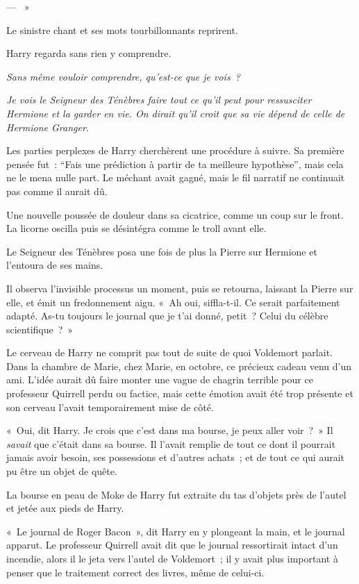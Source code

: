 --- ~»

Le sinistre chant et ses mots tourbillonnants reprirent.

Harry regarda sans rien y comprendre.

\emph{Sans même vouloir comprendre, qu'est-ce que je vois~?}

\emph{Je vois le Seigneur des Ténèbres faire tout ce qu'il peut pour ressusciter Hermione et la garder en vie. On dirait qu'il croit que sa vie dépend de celle de Hermione Granger}.

Les parties perplexes de Harry cherchèrent une procédure à suivre. Sa première pensée fut~: “Fais une prédiction à partir de ta meilleure hypothèse”, mais cela ne le mena nulle part. Le méchant avait gagné, mais le fil narratif ne continuait pas comme il aurait dû.

Une nouvelle poussée de douleur dans sa cicatrice, comme un coup sur le front. La licorne oscilla puis se désintégra comme le troll avant elle.

Le Seigneur des Ténèbres posa une fois de plus la Pierre sur Hermione et l'entoura de ses mains.

Il observa l'invisible processus un moment, puis se retourna, laissant la Pierre sur elle, et émit un fredonnement aigu. «~Ah oui, siffla-t-il. Ce serait parfaitement adapté. As-tu toujours le journal que je t'ai donné, petit~? Celui du célèbre scientifique~?~»

Le cerveau de Harry ne comprit pas tout de suite de quoi Voldemort parlait. Dans la chambre de Marie, chez Marie, en octobre, ce précieux cadeau venu d'un ami. L'idée aurait dû faire monter une vague de chagrin terrible pour ce professeur Quirrell perdu ou factice, mais cette émotion avait été trop présente et son cerveau l'avait temporairement mise de côté.

«~Oui, dit Harry. Je crois que c'est dans ma bourse, je peux aller voir~?~» Il \emph{savait} que c'était dans sa bourse. Il l'avait remplie de tout ce dont il pourrait jamais avoir besoin, ses possessions et d'autres achats~; et de tout ce qui aurait pu être un objet de quête.

La bourse en peau de Moke de Harry fut extraite du tas d'objets près de l'autel et jetée aux pieds de Harry.

«~Le journal de Roger Bacon~», dit Harry en y plongeant la main, et le journal apparut. Le professeur Quirrell avait dit que le journal ressortirait intact d'un incendie, alors il le jeta vers l'autel de Voldemort~; il y avait plus important à penser que le traitement correct des livres, même de celui-ci.


